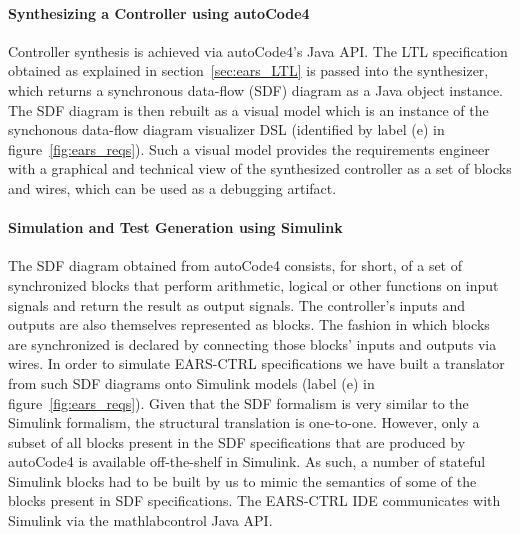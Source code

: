 \paragraph{\textbf{Synthesizing a Controller using \textsf{autoCode4}}\\}
\hspace{-.2cm}Controller synthesis is achieved via \textsf{autoCode4}'s Java
API. The LTL specification obtained as explained in section~\ref{sec:ears_LTL}
is passed into the synthesizer, which returns a synchronous data-flow (SDF)
diagram as a Java object instance. The SDF diagram is then rebuilt as a visual model
which is an instance of the synchonous data-flow diagram visualizer DSL
(identified by label (\textsf{e}) in figure~\ref{fig:ears_reqs}). Such a visual
model provides the requirements engineer with a graphical and technical view of
the synthesized controller as a set of blocks and wires, which can be used as a
debugging artifact.\vspace{-.2cm}
\paragraph{\textbf{Simulation and Test Generation using Simulink}\\}
\hspace{-.2cm}The SDF diagram obtained from \textsf{autoCode4} consists, for
short, of a set of synchronized blocks that perform arithmetic, logical or other functions
on input signals and return the result as output signals. The
controller's inputs and outputs are also themselves represented as blocks. The
fashion in which blocks are synchronized is declared by connecting those blocks'
inputs and outputs via wires. In order to simulate \textsf{EARS-CTRL}
specifications we have built a translator from such SDF diagrams onto Simulink
models (label (\textsf{e}) in figure~\ref{fig:ears_reqs}). Given that the SDF
formalism is very similar to the Simulink formalism, the structural translation is one-to-one. However, only a subset of all blocks
present in the SDF specifications that are produced by \textsf{autoCode4} is
available off-the-shelf in Simulink. As such, a number of stateful Simulink
blocks had to be built by us to mimic the semantics of some of the blocks
present in SDF specifications. The \textsf{EARS-CTRL} IDE
communicates with Simulink via the \textsf{mathlabcontrol}\cite{mathlabcontrol}
Java API.\vspace{-.6cm}
